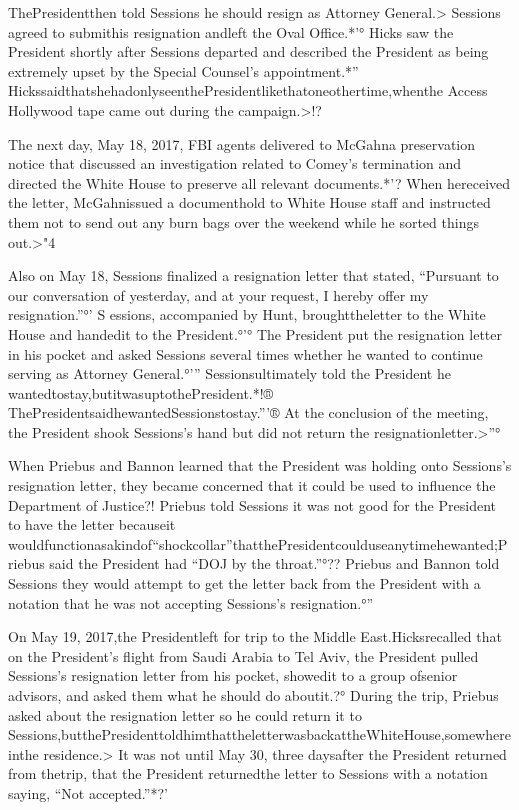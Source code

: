 {ThePresidentthen told Sessions he should resign as Attorney General.>
Sessions agreed to submithis resignation andleft the Oval Office.*'°
Hicks saw the President shortly after Sessions departed and described the President as being extremely upset by the Special Counsel’s appointment.*''
HickssaidthatshehadonlyseenthePresidentlikethatoneothertime,whenthe Access Hollywood tape came out during the campaign.>!?

The next day, May 18, 2017, FBI agents delivered to McGahna preservation notice that discussed an investigation related to Comey’s termination and directed the White House to preserve all relevant documents.*'?
When hereceived the letter, McGahnissued a documenthold to White House staff and instructed them not to send out any burn bags over the weekend while he sorted things out.>"4

Also on May 18, Sessions finalized a resignation letter that stated, “Pursuant to our conversation of yesterday, and at your request, I hereby offer my resignation.”°' S
essions, accompanied by Hunt, broughttheletter to the White House and handedit to the President.°'°
The President put the resignation letter in his pocket and asked Sessions several times whether he wanted to continue serving as Attorney General.°'”
Sessionsultimately told the President he wantedtostay,butitwasuptothePresident.*!®
ThePresidentsaidhewantedSessionstostay.”'®
At the conclusion of the meeting, the President shook Sessions’s hand but did not return the resignationletter.>”°

When Priebus and Bannon learned that the President was holding onto Sessions’s resignation letter, they became concerned that it could be used to influence the Department of Justice?!
Priebus told Sessions it was not good for the President to have the letter becauseit wouldfunctionasakindof“shockcollar”thatthePresidentcoulduseanytimehewanted;Priebus said the President had “DOJ by the throat.”°??
Priebus and Bannon told Sessions they would attempt to get the letter back from the President with a notation that he was not accepting Sessions’s resignation.°”

On May 19, 2017,the Presidentleft for trip to the Middle East.Hicksrecalled that on the President’s flight from Saudi Arabia to Tel Aviv, the President pulled Sessions’s resignation letter from his pocket, showedit to a group ofsenior advisors, and asked them what he should do aboutit.?°
During the trip, Priebus asked about the resignation letter so he could return it to Sessions,butthePresidenttoldhimthattheletterwasbackattheWhiteHouse,somewhereinthe residence.>
It was not until May 30, three daysafter the President returned from thetrip, that the President returnedthe letter to Sessions with a notation saying, “Not accepted.”*?’

}
